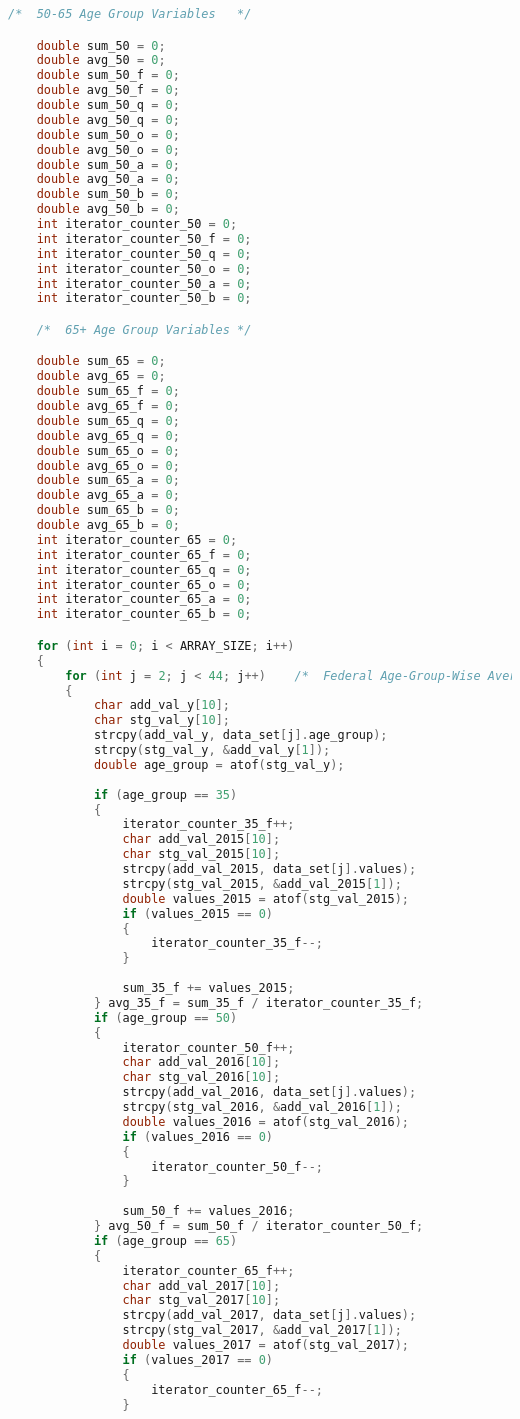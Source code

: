\begin{lstlisting}[language=C, caption=\textit{CPS 188 Term Project Source Code}]
	/*	50-65 Age Group Variables	*/

	double sum_50 = 0;
	double avg_50 = 0;
	double sum_50_f = 0;
	double avg_50_f = 0;
	double sum_50_q = 0;
	double avg_50_q = 0;
	double sum_50_o = 0;
	double avg_50_o = 0;
	double sum_50_a = 0;
	double avg_50_a = 0;
	double sum_50_b = 0;
	double avg_50_b = 0;
	int iterator_counter_50 = 0;
	int iterator_counter_50_f = 0;
	int iterator_counter_50_q = 0;
	int iterator_counter_50_o = 0;
	int iterator_counter_50_a = 0;
	int iterator_counter_50_b = 0;

	/*	65+ Age Group Variables	*/

	double sum_65 = 0;
	double avg_65 = 0;
	double sum_65_f = 0;
	double avg_65_f = 0;
	double sum_65_q = 0;
	double avg_65_q = 0;
	double sum_65_o = 0;
	double avg_65_o = 0;
	double sum_65_a = 0;
	double avg_65_a = 0;
	double sum_65_b = 0;
	double avg_65_b = 0;
	int iterator_counter_65 = 0;
	int iterator_counter_65_f = 0;
	int iterator_counter_65_q = 0;
	int iterator_counter_65_o = 0;
	int iterator_counter_65_a = 0;
	int iterator_counter_65_b = 0;

    for (int i = 0; i < ARRAY_SIZE; i++)
    {
		for (int j = 2; j < 44; j++)	/*	Federal Age-Group-Wise Average Calculator	*/
		{
			char add_val_y[10];
			char stg_val_y[10];
			strcpy(add_val_y, data_set[j].age_group);
			strcpy(stg_val_y, &add_val_y[1]);
			double age_group = atof(stg_val_y);
			
			if (age_group == 35)
			{
				iterator_counter_35_f++;
				char add_val_2015[10];
				char stg_val_2015[10];
				strcpy(add_val_2015, data_set[j].values);
				strcpy(stg_val_2015, &add_val_2015[1]);
				double values_2015 = atof(stg_val_2015);
				if (values_2015 == 0)
				{
					iterator_counter_35_f--;
				}
				
				sum_35_f += values_2015;
			} avg_35_f = sum_35_f / iterator_counter_35_f;
			if (age_group == 50)
			{
				iterator_counter_50_f++;
				char add_val_2016[10];
				char stg_val_2016[10];
				strcpy(add_val_2016, data_set[j].values);
				strcpy(stg_val_2016, &add_val_2016[1]);
				double values_2016 = atof(stg_val_2016);
				if (values_2016 == 0)
				{
					iterator_counter_50_f--;
				}
				
				sum_50_f += values_2016;
			} avg_50_f = sum_50_f / iterator_counter_50_f;
			if (age_group == 65)
			{
				iterator_counter_65_f++;
				char add_val_2017[10];
				char stg_val_2017[10];
				strcpy(add_val_2017, data_set[j].values);
				strcpy(stg_val_2017, &add_val_2017[1]);
				double values_2017 = atof(stg_val_2017);
				if (values_2017 == 0)
				{
					iterator_counter_65_f--;
				}
				

\end{lstlisting}
